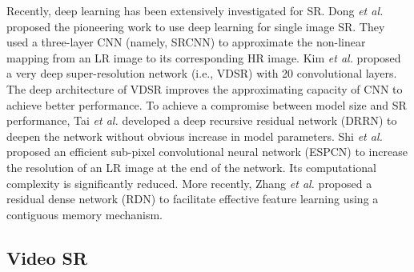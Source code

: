 \documentclass[journal]{IEEEtran}
\begin{document}
Recently, deep learning has been extensively investigated for SR. Dong \emph{et al.} \cite{2014-LearningaDeepConvolutionalNetworkforImageSuperResolution-Dong-184-199} proposed the pioneering work to use deep learning for single image SR. They used a three-layer CNN (namely, SRCNN) to approximate the non-linear mapping from an LR image to its corresponding HR image. Kim \emph{et al.} \cite{2016-AccurateImageSuperResolutionUsingVeryDeepConvolutionalNetworks-Kim-1646-1654} proposed a very deep super-resolution network (i.e., VDSR) with 20 convolutional layers. The deep architecture of VDSR improves the approximating capacity of CNN to achieve better performance. To achieve a compromise between model size and SR performance, Tai \emph{et al.} \cite{2017-ImageSuperResolutionViaDeepRecursiveResidualNetwork-Tai-2790-2798} developed a deep recursive residual network (DRRN) to deepen the network without obvious increase in model parameters. Shi \emph{et al.} \cite{2016-RealTimeSingleImageandVideoSuperResolutionUsinganEfficientSubPixelConvolutionalNeuralNetwork-Shi-1874-1883} proposed an efficient sub-pixel convolutional neural network (ESPCN) to increase the resolution of an LR image at the end of the network. Its computational complexity is significantly reduced. More recently, Zhang \emph{et al.} \cite{2018-ResidualDenseNetworkforImageSuperResolution-Zhang--} proposed a residual dense network (RDN) to facilitate effective feature learning using a contiguous memory mechanism.
	
	\subsection{Video SR}
\end{document}
